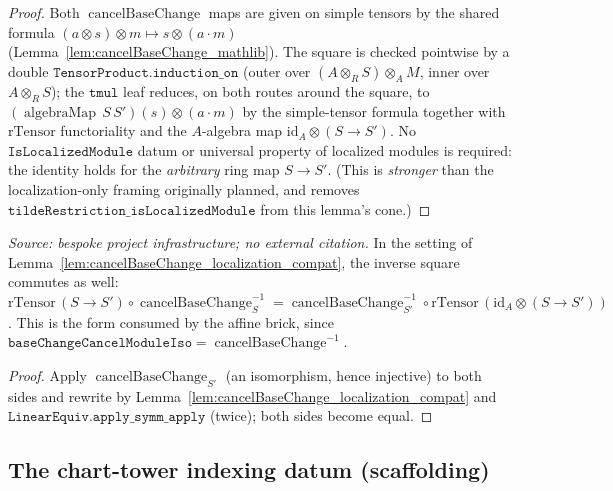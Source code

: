 \begin{proof}
  \leanok
  Both \(\operatorname{cancelBaseChange}\) maps are given on simple tensors by the shared formula
  \((a \otimes s) \otimes m \mapsto s \otimes (a \cdot m)\) (Lemma~\ref{lem:cancelBaseChange_mathlib}).
  The square is checked pointwise by a double \(\mathtt{TensorProduct.induction\_on}\) (outer over
  \((A \otimes_R S) \otimes_A M\), inner over \(A \otimes_R S\)); the \(\mathtt{tmul}\) leaf
  reduces, on both routes around the square, to
  \((\operatorname{algebraMap}\,S\,S')(s) \otimes (a \cdot m)\) by the simple-tensor formula together
  with \(\mathrm{rTensor}\) functoriality and the \(A\)-algebra map \(\mathrm{id}_A \otimes (S\to S')\).
  No \(\mathtt{IsLocalizedModule}\) datum or universal property of localized modules is required: the
  identity holds for the \emph{arbitrary} ring map \(S \to S'\). (This is \emph{stronger} than the
  localization-only framing originally planned, and removes
  \(\mathtt{tildeRestriction\_isLocalizedModule}\) from this lemma's cone.)
\end{proof}

\begin{lemma}\leanok
  \label{lem:cancelBaseChange_localization_compat_symm}
  \textit{Source: bespoke project infrastructure; no external citation.}
  In the setting of Lemma~\ref{lem:cancelBaseChange_localization_compat}, the inverse square
  commutes as well:
  \(\mathrm{rTensor}\,(S \to S') \circ \operatorname{cancelBaseChange}_S^{-1}
   = \operatorname{cancelBaseChange}_{S'}^{-1} \circ \mathrm{rTensor}\,(\mathrm{id}_A \otimes (S \to S'))\).
  This is the form consumed by the affine brick, since
  \(\mathtt{baseChangeCancelModuleIso} = \operatorname{cancelBaseChange}^{-1}\).
\end{lemma}
\begin{proof}
  \leanok
  Apply \(\operatorname{cancelBaseChange}_{S'}\) (an isomorphism, hence injective) to both sides and
  rewrite by Lemma~\ref{lem:cancelBaseChange_localization_compat} and
  \(\mathtt{LinearEquiv.apply\_symm\_apply}\) (twice); both sides become equal.
\end{proof}

\subsection{The chart-tower indexing datum (scaffolding)}


